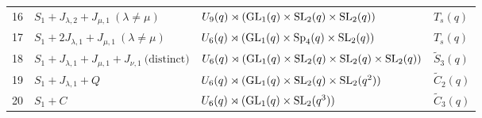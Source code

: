 \begin{longtable}{@{}c p{} p{} p{}@{}}
16 & \(S_1 + J_{\lambda,2} + J_{\mu,1}\ (\lambda \ne \mu)\) & $U_9(q)\rtimes (\mathrm{GL}_1(q)\times \mathrm{SL}_2(q)\times \mathrm{SL}_2(q))$ & $T_s(q)$ \\
17 & \(S_1 + 2J_{\lambda,1} + J_{\mu,1}\ (\lambda \ne \mu)\) & $U_6(q)\rtimes (\mathrm{GL}_1(q)\times \mathrm{Sp}_4(q)\times \mathrm{SL}_2(q))$ & $T_s(q)$ \\
18 & \(S_1 + J_{\lambda,1} + J_{\mu,1} + J_{\nu,1}\ \text{(distinct)}\) & $U_6(q)\rtimes (\mathrm{GL}_1(q)\times \mathrm{SL}_2(q)\times \mathrm{SL}_2(q)\times \mathrm{SL}_2(q))$ & $\widetilde{S}_3(q)$ \\
19 & \(S_1 + J_{\lambda,1} + Q\) & $U_6(q)\rtimes (\mathrm{GL}_1(q)\times \mathrm{SL}_2(q)\times \mathrm{SL}_2(q^2))$ & $\widetilde{C}_2(q)$ \\
20 & \(S_1 + C\) & $U_6(q)\rtimes (\mathrm{GL}_1(q)\times \mathrm{SL}_2(q^3))$ & $\widetilde{C}_3(q)$ \\
\end{longtable}

